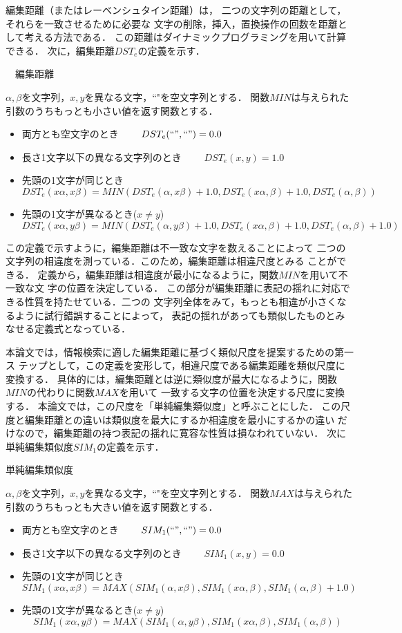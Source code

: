 編集距離（またはレーベンシュタイン距離）は，
二つの文字列の距離として，それらを一致させるために必要な
文字の削除，挿入，置換操作の回数を距離として考える方法である．
この距離はダイナミックプログラミングを用いて計算できる．
次に，編集距離$DST_e$の定義を示す．
\begin{df}　編集距離

$\alpha,\beta$を文字列，$x,y$を異なる文字，``"を空文字列とする．
関数$MIN$は与えられた引数のうちもっとも小さい値を返す関数とする．
\begin{itemize}
 \item 両方とも空文字のとき~~~~
	   $ DST_e(``",``")=0.0 $
 \item 長さ1文字以下の異なる文字列のとき~~~~ 
	   $ DST_e(x,y)=1.0 $
 \item 先頭の1文字が同じとき
\[ DST_e(x\alpha,x\beta)=MIN(DST_e(\alpha,x\beta)+1.0,
DST_e(x\alpha,\beta)+1.0,
DST_e(\alpha,\beta)) \]
 \item 先頭の1文字が異なるとき($x \neq y$)
\[ DST_e(x\alpha,y\beta)=MIN(DST_e(\alpha,y\beta)+1.0,
DST_e(x\alpha,\beta)+1.0,
DST_e(\alpha,\beta)+1.0) \]
\end{itemize}
\end{df}
この定義で示すように，編集距離は不一致な文字を数えることによって
二つの文字列の相違度を測っている．このため，編集距離は相違尺度とみる
ことができる．
定義から，編集距離は相違度が最小になるように，関数$MIN$を用いて不一致な文
字の位置を決定している．
この部分が編集距離に表記の揺れに対応できる性質を持たせている．二つの
文字列全体をみて，もっとも相違が小さくなるように試行錯誤することによって，
表記の揺れがあっても類似したものとみなせる定義式となっている．

本論文では，情報検索に適した編集距離に基づく類似尺度を提案するための第一ス
テップとして，この定義を変形して，相違尺度である編集距離を類似尺度に変換する．
具体的には，編集距離とは逆に類似度が最大になるように，関数$MIN$の代わりに関数$MAX$を用いて
一致する文字の位置を決定する尺度に変換する．
本論文では，この尺度を「単純編集類似度」と呼ぶことにした．
この尺度と編集距離との違いは類似度を最大にするか相違度を最小にするかの違い
だけなので，編集距離の持つ表記の揺れに寛容な性質は損なわれていない．
次に単純編集類似度$SIM_1$の定義を示す．
\begin{df} 単純編集類似度

$\alpha,\beta$を文字列，$x,y$を異なる文字，``"を空文字列とする．
関数$MAX$は与えられた引数のうちもっとも大きい値を返す関数とする．
\begin{itemize}
 \item 両方とも空文字のとき~~~~
	   $ SIM_1(``",``")=0.0 $
 \item 長さ1文字以下の異なる文字列のとき~~~~
	   $ SIM_1(x,y)=0.0 $
 \item 先頭の1文字が同じとき
\[ SIM_1(x\alpha,x\beta)=MAX(SIM_1(\alpha,x\beta),
SIM_1(x\alpha,\beta),
SIM_1(\alpha,\beta)+1.0) \]
 \item 先頭の1文字が異なるとき($x \neq y$)
\[SIM_1(x\alpha,y\beta)=MAX(SIM_1(\alpha,y\beta),
SIM_1(x\alpha,\beta),
SIM_1(\alpha,\beta)) \]
\end{itemize}
\label{sim1}
\end{df}

